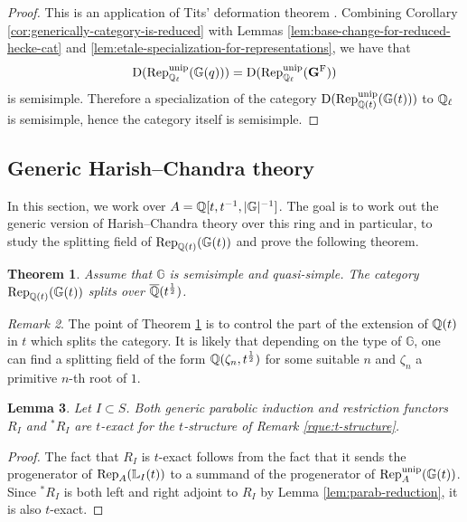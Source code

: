 \documentclass[a4paper, 10pt, oneside, reqno]{amsart}
\theoremstyle{plain}
\newtheorem{thm}{Theorem}[subsection]
\newtheorem{lem}[thm]{Lemma}
\theoremstyle{definition}
\theoremstyle{remark}
\newtheorem{rque}[thm]{Remark}
\newcommand{\Gbb}{\mathbb{G}}
\newcommand{\Lbb}{\mathbb{L}}
\begin{document}
\begin{proof}
This is an application of Tits' deformation theorem \cite[Chap. IV, §2,
Exercise 27]{Bourbaki456}. Combining Corollary \ref{cor:generically-category-is-reduced} with Lemmas \ref{lem:base-change-for-reduced-hecke-cat} and \ref{lem:etale-specialization-for-representations}, we have that 
$$\DD(\Rep_{\Ql}^{\unip}(\Gbb(q))) = \DD(\Rep_{\Ql}^{\unip}(\Gbf^{\Frob}))$$
is semisimple. Therefore a specialization of the category $\DD(\Rep^{\unip}_{\Q(t)}(\Gbb(t)))$ to $\mathbb{Q}_{\ell}$ is semisimple, hence the category itself is semisimple. 
\end{proof}

\subsection{Generic Harish--Chandra theory}

In this section, we work over $A = \Q[t,t^{-1}, |\Gbb|^{-1}]$. The goal is to work out the generic version of Harish--Chandra theory over this ring and in particular, to study the splitting field of $\Rep_{\Q(t)}(\Gbb(t))$ and prove the following theorem.

\begin{thm}\label{thm:splitting-field}
Assume that $\Gbb$ is semisimple and quasi-simple. 
The category $\Rep_{\Q(t)}(\Gbb(t))$ splits over $\overline{\mathbb{Q}}(t^{\frac{1}{2}})$. 
\end{thm}

\begin{rque}
The point of Theorem \ref{thm:splitting-field} is to control the part of the extension of $\mathbb{Q}(t)$ in $t$ which splits the category. It is likely that depending on the type of $\Gbb$, one can find a splitting field of the form $\mathbb{Q}(\zeta_n, t^{\frac{1}{2}})$ for some suitable $n$ and $\zeta_n$ a primitive $n$-th root of $1$. 
\end{rque} 

\begin{lem}
Let $I \subset S$. Both generic parabolic induction and restriction functors $R_I$ and ${^*}R_I$ are $t$-exact for the $t$-structure of Remark \ref{rque:t-structure}. 
\end{lem}

\begin{proof}
The fact that $R_I$ is $t$-exact follows from the fact that it sends the progenerator of $\Rep_A(\Lbb_I(t))$ to a summand of the progenerator of $\Rep_A^{\unip}(\Gbb(t))$. Since ${^*}R_I$ is both left and right adjoint to $R_I$ by Lemma \ref{lem:parab-reduction}, it is also $t$-exact. 
\end{proof}
\end{document}
